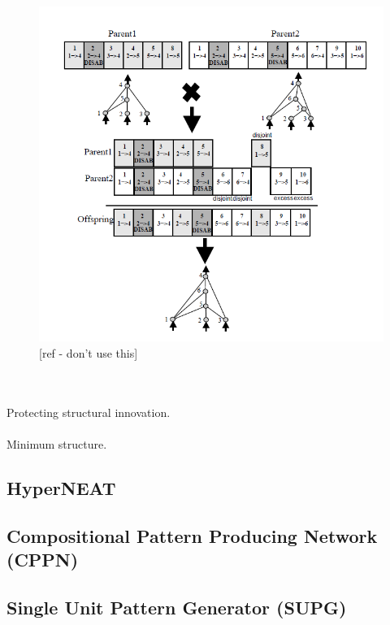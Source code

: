 \documentclass[11pt, a4paper]{article}
\begin{document}
\begin{figure}[!ht]
\centering
\includegraphics[scale=0.5]{NEAT_Matching}
\caption{[ref - don't use this]}
\end{figure}
\\
\\
Protecting structural innovation.
\\
\\
Minimum structure.
\subsection{HyperNEAT}
\subsection{Compositional Pattern Producing Network (CPPN)}
\subsection{Single Unit Pattern Generator (SUPG)}
\end{document}
